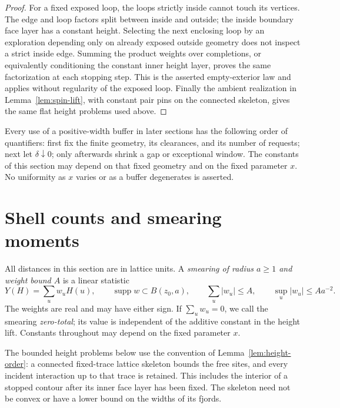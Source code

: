 \documentclass[11pt]{article}
\DeclareMathOperator{\supp}{supp}
\theoremstyle{definition}
\theoremstyle{remark}
\numberwithin{equation}{section}
\begin{document}
\begin{proof}
For a fixed exposed loop, the loops strictly inside cannot touch its
vertices. The edge and loop factors split between inside and outside;
the inside boundary face layer has a constant height. Selecting the next
enclosing loop by an exploration depending only on already exposed
outside geometry does not inspect a strict inside edge. Summing the
product weights over completions, or equivalently conditioning the
constant inner height layer, proves the same factorization at each
stopping step. This is the asserted empty-exterior law and applies
without regularity of the exposed loop. Finally the ambient realization
in Lemma~\ref{lem:spin-lift}, with constant pair pins on the connected
skeleton, gives the same flat height problems used above.
\end{proof}

Every use of a positive-width buffer in later sections has the following
order of quantifiers: first fix the finite geometry, its clearances, and
its number of requests; next let $\delta\downarrow0$; only afterwards
shrink a gap or exceptional window. The constants of this section may
depend on that fixed geometry and on the fixed parameter $x$. No
uniformity as $x$ varies or as a buffer degenerates is asserted.

\section{Shell counts and smearing moments}\label{sec:moments}

All distances in this section are in lattice units.  A \emph{smearing of
radius $a\geq1$ and weight bound $A$} is a linear statistic
\begin{equation}\label{moments:weights}
 Y(H)=\sum_u w_uH(u),\qquad
 \supp w\subset B(z_0,a),\qquad
 \sum_u|w_u|\leq A,\qquad \sup_u|w_u|\leq Aa^{-2}.
\end{equation}
The weights are real and may have either sign.  If $\sum_uw_u=0$, we
call the smearing \emph{zero-total}; its value is independent of the
additive constant in the height lift.  Constants throughout may depend
on the fixed parameter $x$.

The bounded height problems below use the convention of
Lemma~\ref{lem:height-order}: a connected fixed-trace lattice skeleton
bounds the free sites, and every incident interaction up to that trace
is retained.  This includes the interior of a stopped contour after its
inner face layer has been fixed.  The skeleton need not be convex or
have a lower bound on the widths of its fjords.
\end{document}
